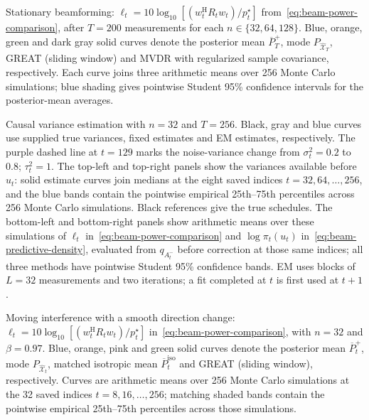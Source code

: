 
\caption{Stationary beamforming: $\ell_t=10\log_{10}[(w_t^{\mathrm H}R_tw_t)/p_t^\star]$ from~\eqref{eq:beam-power-comparison}, after $T=200$ measurements for each $n\in\{32,64,128\}$. Blue, orange, green and dark gray solid curves denote the posterior mean $\overline P_T^+$, mode $P_{\widehat{\mathcal X}_T}$, GREAT (sliding window) and MVDR with regularized sample covariance, respectively. Each curve joins three arithmetic means over 256 Monte Carlo simulations; blue shading gives pointwise Student 95\% confidence intervals for the posterior-mean averages.}

\caption{Causal variance estimation with $n=32$ and $T=256$. Black, gray and blue curves use supplied true variances, fixed estimates and EM estimates, respectively. The purple dashed line at $t=129$ marks the noise-variance change from $\sigma_t^2=0.2$ to $0.8$; $\tau_t^2=1$. The top-left and top-right panels show the variances available before $u_t$: solid estimate curves join medians at the eight saved indices $t=32,64,\ldots,256$, and the blue bands contain the pointwise empirical 25th--75th percentiles across 256 Monte Carlo simulations. Black references give the true schedules. The bottom-left and bottom-right panels show arithmetic means over these simulations of $\ell_t$ in~\eqref{eq:beam-power-comparison} and $\log\pi_t(u_t)$ in~\eqref{eq:beam-predictive-density}, evaluated from $q_{A_t^-}$ before correction at those same indices; all three methods have pointwise Student 95\% confidence bands. EM uses blocks of $L=32$ measurements and two iterations; a fit completed at $t$ is first used at $t+1$.}

\caption{Moving interference with a smooth direction change: $\ell_t=10\log_{10}[(w_t^{\mathrm H}R_tw_t)/p_t^\star]$ in~\eqref{eq:beam-power-comparison}, with $n=32$ and $\beta=0.97$. Blue, orange, pink and green solid curves denote the posterior mean $\overline P_t^+$, mode $P_{\widehat{\mathcal X}_t}$, matched isotropic mean $\overline P_t^{\mathrm{iso}}$ and GREAT (sliding window), respectively. Curves are arithmetic means over 256 Monte Carlo simulations at the 32 saved indices $t=8,16,\ldots,256$; matching shaded bands contain the pointwise empirical 25th--75th percentiles across those simulations.}

